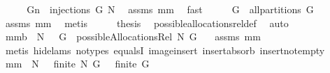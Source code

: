 \begin{isabellebody}
%
\isadelimproof
%
\endisadelimproof
%
\isatagproof
{}\isamarkupfalse%
\ {\isacharminus}\isanewline
\ \ \isamarkupfalse%
\ {\isachardoublequoteopen}{\isacharbraceleft}{\isacharparenleft}G{\isacharcomma}n{\isacharparenright}{\isacharbraceright}\ {\isasymin}\ injections\ {\isacharbraceleft}G{\isacharbraceright}\ N{\isachardoublequoteclose}\ \isamarkupfalse%
\ assms\ mm{}{}\ \isamarkupfalse%
\ fast\isanewline
\ \ \isamarkupfalse%
\ \isamarkupfalse%
\ {\isachardoublequoteopen}{\isacharbraceleft}G{\isacharbraceright}\ {\isasymin}\ all{\isacharunderscore}partitions\ G{\isachardoublequoteclose}\ \isamarkupfalse%
\ assms\ mm{}{}\ \isamarkupfalse%
\ metis\isanewline
\ \ \isamarkupfalse%
\ \isamarkupfalse%
\ {\isacharquery}thesis\ \isamarkupfalse%
\ possible{\isacharunderscore}allocations{\isacharunderscore}rel{\isacharunderscore}def\ \isamarkupfalse%
\ auto\isanewline
{}\isamarkupfalse%
%
\endisatagproof
{\isafoldproof}%
%
\isadelimproof
\isanewline
%
\endisadelimproof
{}\isamarkupfalse%
\ mm{}{}b{\isacharcolon}\ \ {\isachardoublequoteopen}N\ {\isasymnoteq}\ {\isacharbraceleft}{\isacharbraceright}{\isachardoublequoteclose}\ {\isachardoublequoteopen}G{\isasymnoteq}{\isacharbraceleft}{\isacharbraceright}{\isachardoublequoteclose}\ \ {\isachardoublequoteopen}possibleAllocationsRel\ N\ G\ {\isasymnoteq}\ {\isacharbraceleft}{\isacharbraceright}{\isachardoublequoteclose}\isanewline
%
\isadelimproof
%
\endisadelimproof
%
\isatagproof
{}\isamarkupfalse%
\ assms\ mm{}{}\ \isamarkupfalse%
\ {\isacharparenleft}metis\ {\isacharparenleft}hide{\isacharunderscore}lams{\isacharcomma}\ no{\isacharunderscore}types{\isacharparenright}\ equals{}I\ image{\isacharunderscore}insert\ insert{\isacharunderscore}absorb\ insert{\isacharunderscore}not{\isacharunderscore}empty{\isacharparenright}%
\endisatagproof
{\isafoldproof}%
%
\isadelimproof
\isanewline
%
\endisadelimproof
{}\isamarkupfalse%
\ mm{}{}{\isacharcolon}\ \ {\isachardoublequoteopen}N\ {\isasymnoteq}\ {\isacharbraceleft}{\isacharbraceright}{\isachardoublequoteclose}\ {\isachardoublequoteopen}finite\ N{\isachardoublequoteclose}\ {\isachardoublequoteopen}G\ {\isasymnoteq}\ {\isacharbraceleft}{\isacharbraceright}{\isachardoublequoteclose}\ {\isachardoublequoteopen}finite\ G{\isachardoublequoteclose}\ \ \isanewline

\end{isabellebody}
